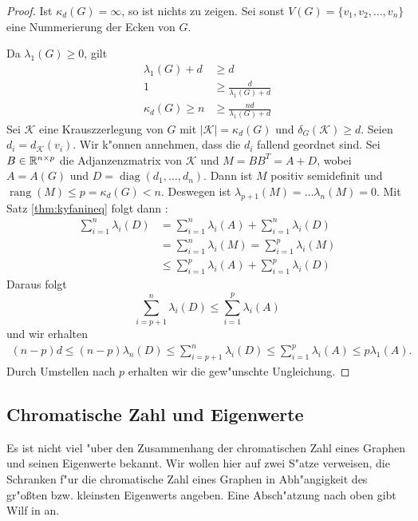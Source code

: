  \begin{proof}
    Ist $\kappa_{d}(G) = \infty$, so ist nichts zu zeigen. Sei sonst $V(G) = \{v_1,v_2,\dots, v_n\}$ eine Nummerierung der Ecken von $G$.

     Da $\lambda_{1}(G) \geq 0$, gilt 
    \begin{align*}
      \lambda_{1}(G) + d &\geq d \\
      1 &\geq \frac{d}{\lambda_{1}(G) + d }\\
      \kappa_{d}(G) \geq n &\geq \frac{nd}{\lambda_{1}(G)+d}
    \end{align*}
    Sei $\mathcal{K}$ eine Krauszzerlegung von $G$ mit $|\mathcal{K}| = \kappa_{d}(G)$ und $\delta_{G}(\mathcal{K}) \geq d$. Seien $d_{i} = d_{\mathcal{K}}(v_i)$. Wir k"onnen annehmen, dass die $d_{i}$ fallend geordnet sind. Sei $B\in {\mathbb{R}}^{n\times p}$ die Adjanzenzmatrix von $\mathcal{K}$ und $M = BB^{T} = A+D$, wobei $A= A(G)$ und $D = \operatorname{diag}(d_{1},\dots,d_n)$.
    Dann ist $M$ positiv semidefinit und $\operatorname{rang} (M) \leq p = \kappa_{d}(G) < n $. Deswegen ist $\lambda_{p+1}(M) = \dots \lambda_{n}(M) = 0$. 
    Mit Satz \ref{thm:kyfanineq} folgt dann : 
    \begin{align*}
      \sum\limits_{i=1}^{n} \lambda_{i}(D) &=\sum\limits_{i=1}^{n} \lambda_{i}(A) +\sum\limits_{i=1}^{n}  \lambda_{i}(D) \\
      &=\sum\limits_{i=1}^{n} \lambda_{i}(M) =\sum\limits_{i=1}^{p} \lambda_{i}(M) \\
      &\leq \sum\limits_{i=1}^{p} \lambda_{i}(A) +\sum\limits_{i=1}^{p} \lambda_{i}(D)
    \end{align*}
    Daraus folgt 
    $$\sum\limits_{i=p+1}^{n} \lambda_{i}(D) \leq\sum\limits_{i=1}^{p} \lambda_{i}(A)$$ und wir erhalten
    \begin{align*}
      (n-p) d \leq (n-p) \lambda_n(D) \leq \sum\limits_{i=p+1}^{n} \lambda_{i}(D) \leq\sum\limits_{i=1}^{p} \lambda_{i}(A) \leq p\lambda_{1}(A).
    \end{align*}
    Durch Umstellen nach $p$ erhalten wir die gew"unschte Ungleichung.
  \end{proof}

  \subsection{Chromatische Zahl und Eigenwerte}
  Es ist nicht viel "uber den Zusammenhang der chromatischen Zahl eines Graphen und seinen Eigenwerte bekannt. Wir wollen hier auf zwei S"atze verweisen, die Schranken f"ur die chromatische Zahl eines Graphen in Abh"angigkeit des gr"o{\ss}ten bzw. kleinsten Eigenwerts angeben. Eine Absch"atzung nach oben  gibt Wilf in \cite{Wilf67} an.

